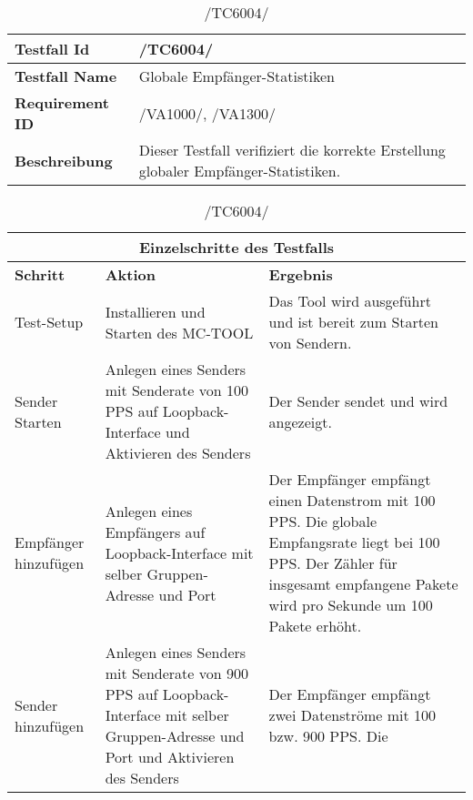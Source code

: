     \begin{table}[h]
        \caption{/TC6004/}
        \label{tab:TC6004}
        \begin{center}
            \begin{tabular}{|p{3.5cm}|p{12cm}|}
                \hline
                    \textbf{Testfall Id} & /TC6004/\\
                \hline
                    \textbf{Testfall Name} & Globale Empfänger-Statistiken\\
                \hline
                    \textbf{Requirement ID} & /VA1000/, /VA1300/\\
                \hline
                    \textbf{Beschreibung} & Dieser Testfall verifiziert die
                    korrekte Erstellung globaler Empfänger-Statistiken.\\
                \hline
            \end{tabular}
            \begin{tabular}{|p{2.5cm}|p{5cm}|p{7.55cm}|}
                \multicolumn{3}{|c|}{\textbf{Einzelschritte des Testfalls}} \\
                \hline
                    \textbf{Schritt} & \textbf{Aktion} & \textbf{Ergebnis}\\
                \hline
                    Test-Setup & Installieren und Starten des MC-TOOL & Das Tool
                    wird ausgeführt und ist bereit zum Starten von Sendern. \\
                \hline
                    Sender Starten & Anlegen eines Senders mit Senderate von 100
                    PPS auf Loopback-Interface und Aktivieren des Senders & Der
                    Sender sendet und wird angezeigt.\\
                \hline
                    Empfänger hinzufügen & Anlegen eines Empfängers
                    auf Loopback-Interface mit selber Gruppen-Adresse und Port &
                    Der Empfänger empfängt einen Datenstrom mit 100 PPS. Die
                    globale Empfangsrate liegt bei 100 PPS. Der Zähler für
                    insgesamt empfangene Pakete wird pro Sekunde um 100
                    Pakete erhöht.\\
                \hline
                    Sender hinzufügen & Anlegen eines Senders mit Senderate von
                    900 PPS auf Loopback-Interface mit selber Gruppen-Adresse
                    und Port und Aktivieren des Senders & Der Empfänger
                    empfängt zwei Datenströme mit 100 bzw. 900 PPS. Die

\end{tabular}
\end{center}
\end{table}
